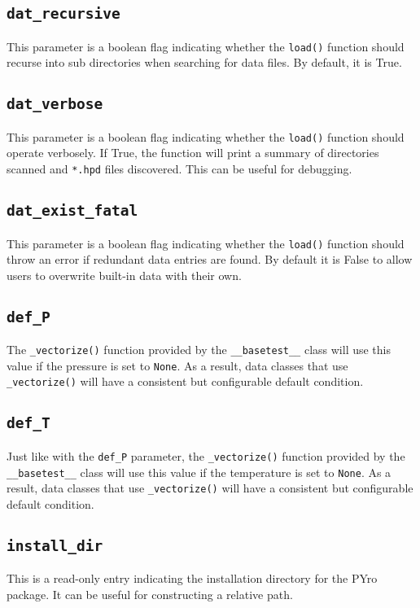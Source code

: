\subsection{\texttt{dat\_recursive}}
This parameter is a boolean flag indicating whether the \verb|load()| function should recurse into sub directories when searching for data files.  By default, it is True.

\subsection{\texttt{dat\_verbose}}
This parameter is a boolean flag indicating whether the \verb|load()| function should operate verbosely.  If True, the function will print a summary of directories scanned and \verb|*.hpd| files discovered.  This can be useful for debugging.

\subsection{\texttt{dat\_exist\_fatal}}
This parameter is a boolean flag indicating whether the \verb|load()| function should throw an error if redundant data entries are found.  By default it is False to allow users to overwrite built-in data with their own.

\subsection{\texttt{def\_P}}
The \verb|_vectorize()| function provided by the \verb|__basetest__| class will use this value if the pressure is set to \verb|None|.  As a result, data classes that use \verb|_vectorize()| will have a consistent but configurable default condition.

\subsection{\texttt{def\_T}}
Just like with the \verb|def_P| parameter, the \verb|_vectorize()| function provided by the \verb|__basetest__| class will use this value if the temperature is set to \verb|None|.  As a result, data classes that use \verb|_vectorize()| will have a consistent but configurable default condition.

\subsection{\texttt{install\_dir}}
This is a read-only entry indicating the installation directory for the PYro package.  It can be useful for constructing a relative path.

